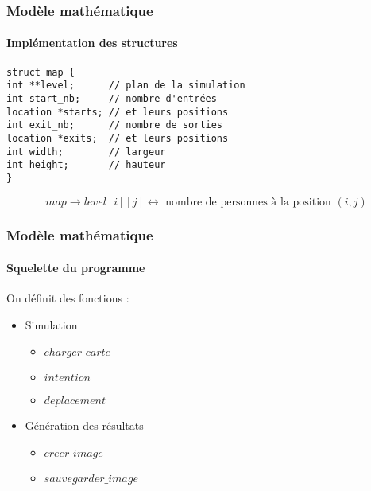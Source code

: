 
\begin{frame}[fragile]
\frametitle{Modèle mathématique}
\framesubtitle{Implémentation des structures}


\begin{code}
\begin{verbatim}
struct map {
int **level;      // plan de la simulation
int start_nb;     // nombre d'entrées
location *starts; // et leurs positions
int exit_nb;      // nombre de sorties
location *exits;  // et leurs positions
int width;        // largeur
int height;       // hauteur
}
\end{verbatim}
\end{code}

\[ map \rightarrow level[i][j] \leftrightarrow \text{ nombre de personnes à la position } (i,j)\]
\end{frame}




\begin{frame}
\frametitle{Modèle mathématique}
\framesubtitle{Squelette du programme}

On définit des fonctions :\\
\begin{itemize}
    \item Simulation
        \begin{itemize}
            \item <2-> $charger\_carte$
            \item <3-> $intention$
            \item <4-> $deplacement$
        \end{itemize}

\bigskip
    \item <5-> Génération des résultats
        \begin{itemize}
            \item <6-> $creer\_image$
            \item <7-> $sauvegarder\_image$
        \end{itemize}
\end{itemize}
\end{frame}





